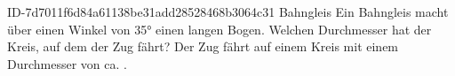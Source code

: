 \begin{exercise}
      {ID-7d7011f6d84a61138be31add28528468b3064c31}
      {Bahngleis}
  \ifproblem\problem
    Ein Bahngleis macht über einen Winkel von \ang{35} einen 
    langen Bogen. Welchen Durchmesser hat der Kreis, auf dem der Zug fährt?
  \fi
  \ifoutcome\outcome
    Der Zug fährt auf einem Kreis mit einem Durchmesser von
    ca. .
  \fi
\end{exercise}
